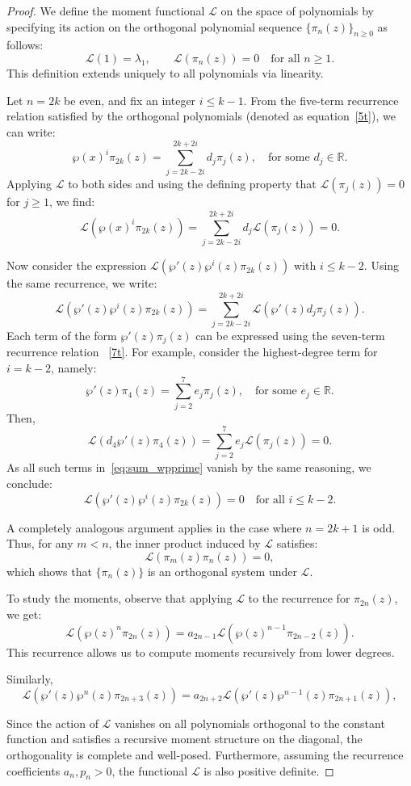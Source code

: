 \documentclass[11pt,a4paper]{article}
\theoremstyle{definition}
\numberwithin{equation}{section}
\numberwithin{theorem}{section}
\begin{document}
\begin{proof}
We define the moment functional \( \mathcal{L} \) on the space of polynomials by specifying its action on the orthogonal polynomial sequence \( \{\pi_n(z)\}_{n \geq 0} \) as follows:
\[
\mathcal{L}(1) = \lambda_1, \qquad \mathcal{L}(\pi_n(z)) = 0 \quad \text{for all } n \geq 1.
\]
This definition extends uniquely to all polynomials via linearity.

Let \( n = 2k \) be even, and fix an integer \( i \leq k - 1 \). From the five-term recurrence relation satisfied by the orthogonal polynomials (denoted as equation~\eqref{5t}), we can write:
\[
\wp(x)^i \pi_{2k}(z) = \sum_{j = 2k - 2i}^{2k + 2i} d_j \pi_j(z), \quad \text{for some } d_j \in \mathbb{R}.
\]
Applying \( \mathcal{L} \) to both sides and using the defining property that \( \mathcal{L}(\pi_j(z)) = 0 \) for \( j \geq 1 \), we find:
\[
\mathcal{L}(\wp(x)^i \pi_{2k}(z)) = \sum_{j = 2k - 2i}^{2k + 2i} d_j \mathcal{L}(\pi_j(z)) = 0.
\]

Now consider the expression \( \mathcal{L}(\wp'(z) \wp^i(z) \pi_{2k}(z)) \) with $i\leq k-2$. Using the same recurrence, we write:
\begin{equation}\label{eq:sum_wpprime}
\mathcal{L}(\wp'(z) \wp^i(z) \pi_{2k}(z)) = \sum_{j = 2k - 2i}^{2k + 2i} \mathcal{L}(\wp'(z) d_j \pi_j(z)).
\end{equation}
Each term of the form \( \wp'(z) \pi_j(z) \) can be expressed using the seven-term recurrence relation ~\eqref{7t}. For example, consider the highest-degree term for \( i = k - 2 \), namely:
\[
\wp'(z) \pi_4(z) = \sum_{j = 2}^{7} e_j \pi_j(z), \quad \text{for some } e_j \in \mathbb{R}.
\]
Then,
\[
\mathcal{L}(d_4 \wp'(z) \pi_4(z)) = \sum_{j = 2}^{7} e_j \mathcal{L}(\pi_j(z)) = 0.
\]
As all such terms in~\eqref{eq:sum_wpprime} vanish by the same reasoning, we conclude:
\[
\mathcal{L}(\wp'(z) \wp^i(z) \pi_{2k}(z)) = 0 \quad \text{for all } i \leq k - 2.
\]

A completely analogous argument applies in the case where \( n = 2k + 1 \) is odd. Thus, for any \( m < n \), the inner product induced by \( \mathcal{L} \) satisfies:
\[
\mathcal{L}(\pi_m(z) \pi_n(z)) = 0,
\]
which shows that \( \{\pi_n(z)\} \) is an orthogonal system under \( \mathcal{L} \).

To study the moments, observe that applying \( \mathcal{L} \) to the recurrence for \( \pi_{2n}(z) \), we get:
\[
\mathcal{L}(\wp(z)^n \pi_{2n}(z)) = a_{2n-1} \mathcal{L}(\wp(z)^{n-1} \pi_{2n-2}(z)).
\]
This recurrence allows us to compute moments recursively from lower degrees.

Similarly,
\[
\mathcal{L}(\wp'(z) \wp^n(z) \pi_{2n+3}(z)) = a_{2n+2} \mathcal{L}(\wp'(z) \wp^{n-1}(z) \pi_{2n+1}(z)),
\]


Since the action of \( \mathcal{L} \) vanishes on all polynomials orthogonal to the constant function and satisfies a recursive moment structure on the diagonal, the orthogonality is complete and well-posed. Furthermore, assuming the recurrence coefficients \( a_n, p_n > 0 \), the functional \( \mathcal{L} \) is also positive definite.
\end{proof}
\end{document}
